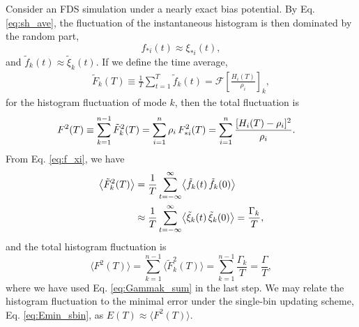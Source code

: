 \documentclass[reprint, superscriptaddress, floatfix]{revtex4-1}
\newcommand{\Err}{E}
\begin{document}
Consider an FDS simulation
under a nearly exact bias potential.
%
By Eq. \eqref{eq:sh_ave},
the fluctuation of the instantaneous histogram
is then dominated by the random part,
%
\begin{equation}
  f_{*i}(t) \approx \xi_{*i}(t)
  ,
  \label{eq:f_xi}
\end{equation}
and
$\tilde f_k(t) \approx \tilde \xi_k(t).$
%
If we define the time average,
%
\begin{align*}
  \tilde F_k(T) \equiv \frac 1 T \sum_{t = 1}^T \tilde f_k(t)
  =\mathcal F\left[ \frac{ H_i(T) } { \rho_i } \right]_k
  ,
\end{align*}
%
for the histogram fluctuation of mode $k$,
then the total fluctuation is
%
\begin{align}
  F^2(T)
  &\equiv
  \sum_{k=1}^{n-1} \tilde F_k^2(T)
  =
  \sum_{i=1}^{n} \rho_i \, F_{*i}^2(T)
  =
  \sum_{i=1}^n
  \frac{ [ H_i(T) -\rho_i]^2 }{\rho_i}
  .
  \notag
\end{align}
%
From Eq. \eqref{eq:f_xi}, we have
%
\begin{align}
  \bigl\langle \tilde F_k^2(T) \bigr\rangle
  &=
  \frac{1}{T}
  \sum_{t=-\infty}^\infty
  \bigl\langle
    \tilde f_k(t) \, \tilde f_k(0)
  \bigr\rangle
  \notag \\
  &\approx
  \frac{1}{T}
  \sum_{t=-\infty}^\infty
  \bigl\langle
    \tilde \xi_k(t) \, \tilde \xi_k(0)
  \bigr\rangle
  =
  \frac{ \Gamma_k } { T }
  ,
  \notag
\end{align}
%
and the total histogram fluctuation is
\begin{equation}
  \bigl\langle F^2(T) \bigr\rangle
  =
  \sum_{k=1}^{n-1}
  \bigl\langle \tilde F_k^2(T) \bigr\rangle
  =
  \sum_{k=1}^{n-1}
  \frac{ \Gamma_k } { T }
  =
  \frac{ \Gamma } { T }
  ,
  \label{eq:F2sum}
\end{equation}
where we have used Eq. \eqref{eq:Gammak_sum}
in the last step.
%
We may relate the histogram fluctuation
to the minimal error under the single-bin updating scheme,
Eq. \eqref{eq:Emin_sbin}, as
  $\Err(T) \approx \bigl\langle F^2(T) \bigr\rangle$.
%
\end{document}

